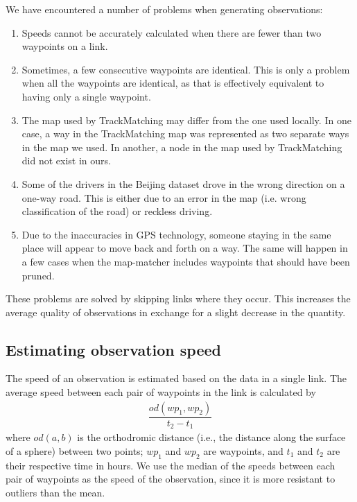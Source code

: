 We have encountered a number of problems when generating observations:

\begin{enumerate}
	\item Speeds cannot be accurately calculated when there are fewer than two waypoints on a link.
	\item Sometimes, a few consecutive waypoints are identical. This is only a problem when all the waypoints are identical, as that is effectively equivalent to having only a single waypoint.
	\item The map used by TrackMatching may differ from the one used locally. In one case, a way in the TrackMatching map was represented as two separate ways in the map we used. In another, a node in the map used by TrackMatching did not exist in ours.
	\item Some of the drivers in the Beijing dataset drove in the wrong direction on a one-way road. This is either due to an error in the map (i.e. wrong classification of the road) or reckless driving.
	\item Due to the inaccuracies in GPS technology, someone staying in the same place will appear to move back and forth on a way. The same will happen in a few cases when the map-matcher includes waypoints that should have been pruned.
\end{enumerate}

These problems are solved by skipping links where they occur. This increases the average quality of observations in exchange for a slight decrease in the quantity.

\subsection{Estimating observation speed}\label{KR:speed} 
The speed of an observation is estimated based on the data in a single link. The average speed between each pair of waypoints in the link is calculated by 
\begin{align*}
\dfrac{od(wp_1, wp_2)}{t_2 - t_1}
\end{align*}
where $od(a, b)$ is the orthodromic distance (i.e., the distance along the surface of a sphere) between two points; $wp_1$ and $wp_2$ are waypoints, and $t_1$ and $t_2$ are their respective time in hours. We use the median of the speeds between each pair of waypoints as the speed of the observation, since it is more resistant to outliers than the mean.

